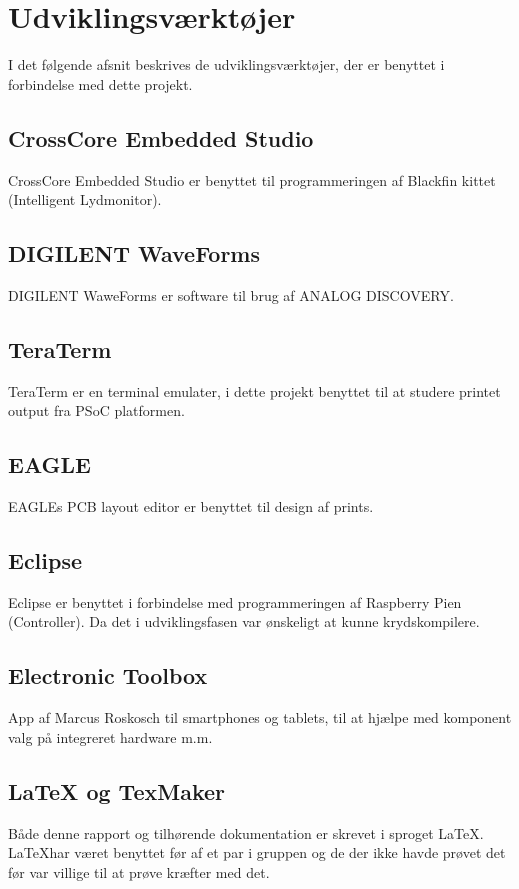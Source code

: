 \chapter{Udviklingsværktøjer}
I det følgende afsnit beskrives de udviklingsværktøjer, der er benyttet i forbindelse med dette projekt. 

\section*{CrossCore Embedded Studio}
CrossCore Embedded Studio er benyttet til programmeringen af Blackfin kittet (Intelligent Lydmonitor).

\section*{DIGILENT WaveForms}
DIGILENT WaweForms er software til brug af ANALOG DISCOVERY.

\section*{TeraTerm}
TeraTerm er en terminal emulater, i dette projekt benyttet til at studere printet output fra PSoC platformen.

\section*{EAGLE}
EAGLEs PCB layout editor er benyttet til design af prints.

\section*{Eclipse}
Eclipse er benyttet i forbindelse med programmeringen af Raspberry Pien (Controller). Da det i udviklingsfasen var ønskeligt at kunne krydskompilere. 

\section*{Electronic Toolbox}
App af Marcus Roskosch til smartphones og tablets, til at hjælpe med komponent valg på integreret hardware m.m.

\section*{LaTeX og TexMaker}
Både denne rapport og tilhørende dokumentation er skrevet i sproget \LaTeX. \LaTeX har været benyttet før af et par i gruppen og de der ikke havde prøvet det før var villige til at prøve kræfter med det.

